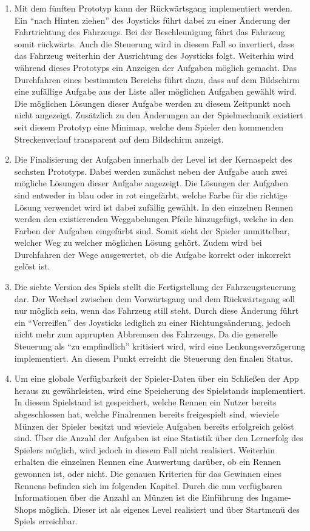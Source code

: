 \begin{enumerate}[itemindent=*,labelsep=\textwidth,label=\textbf{Prototyp \arabic*}]
		\item{ Mit dem fünften Prototyp kann der Rückwärtsgang implementiert werden. Ein \enquote{nach Hinten ziehen} des Joysticks führt dabei zu einer Änderung der Fahrtrichtung des Fahrzeugs. Bei der Beschleunigung fährt das Fahrzeug somit rückwärts. Auch die Steuerung wird in diesem Fall so invertiert, dass das Fahrzeug weiterhin der Ausrichtung des Joysticks folgt. Weiterhin wird während dieses Prototyps ein Anzeigen der Aufgaben möglich gemacht. Das Durchfahren eines bestimmten Bereichs führt dazu, dass auf dem Bildschirm eine zufällige Aufgabe aus der Liste aller möglichen Aufgaben gewählt wird. Die möglichen Lösungen dieser Aufgabe werden zu diesem Zeitpunkt noch nicht angezeigt. Zusätzlich zu den Änderungen an der Spielmechanik existiert seit diesem Prototyp eine Minimap, welche dem Spieler den kommenden Streckenverlauf transparent auf dem Bildschirm anzeigt. }
		\item{ Die Finalisierung der Aufgaben innerhalb der Level ist der Kernaspekt des sechsten Prototyps. Dabei werden zunächst neben der Aufgabe auch zwei mögliche Lösungen dieser Aufgabe angezeigt. Die Lösungen der Aufgaben sind entweder in blau oder in rot eingefärbt, welche Farbe für die richtige Lösung verwendet wird ist dabei zufällig gewählt. In den einzelnen Rennen werden den existierenden Weggabelungen Pfeile hinzugefügt, welche in den Farben der Aufgaben eingefärbt sind. Somit sieht der Spieler unmittelbar, welcher Weg zu welcher möglichen Lösung gehört. Zudem wird bei Durchfahren der Wege ausgewertet, ob die Aufgabe korrekt oder inkorrekt gelöst ist. }
		\item{ Die siebte Version des Spiels stellt die Fertigstellung der Fahrzeugsteuerung dar. Der Wechsel zwischen dem Vorwärtsgang und dem Rückwärtsgang soll nur möglich sein, wenn das Fahrzeug still steht. Durch diese Änderung führt ein \enquote{Verreißen} des Joysticks lediglich zu einer Richtungsänderung, jedoch nicht mehr zum apprupten Abbremsen des Fahrzeugs. Da die generelle Steuerung als \enquote{zu empfindlich} kritisiert wird, wird eine Lenkungsverzögerung implementiert. An diesem Punkt erreicht die Steuerung den finalen Status.}
		\item{ Um eine globale Verfügbarkeit der Spieler-Daten über ein Schließen der App heraus zu gewährleisten, wird eine Speicherung des Spielstands implementiert. In diesem Spielstand ist gespeichert, welche Rennen ein Nutzer bereits abgeschlossen hat, welche Finalrennen bereits freigespielt sind, wieviele Münzen der Spieler besitzt und wieviele Aufgaben bereits erfolgreich gelöst sind. Über die Anzahl der Aufgaben ist eine Statistik über den Lernerfolg des Spielers möglich, wird jedoch in diesem Fall nicht realisiert. Weiterhin erhalten die einzelnen Rennen eine Auswertung darüber, ob ein Rennen gewonnen ist, oder nicht. Die genauen Kriterien für das Gewinnen eines Rennens befinden sich im folgenden Kapitel. Durch die nun verfügbaren Informationen über die Anzahl an Münzen ist die Einführung des Ingame-Shops möglich. Dieser ist als eigenes Level realisiert und über Startmenü des Spiels erreichbar.}

\end{enumerate}
